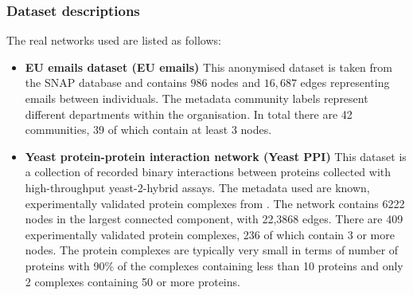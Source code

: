 \documentclass[sigconf]{acmart}
\begin{document}
\subsubsection{Dataset descriptions}
\label{sec:real_network_descs}
The real networks used are listed as follows:
\begin{itemize}
 \item \textbf{EU emails dataset (EU emails)} This anonymised dataset is taken from the SNAP database \cite{snap} and contains $986$ nodes and $16,687$ edges representing emails between individuals.
 The metadata community labels represent different departments within the organisation.
 In total there are 42 communities, 39 of which contain at least 3 nodes.
 
 \item \textbf{Yeast protein-protein interaction network (Yeast PPI)} \cite{yeast_ppi}
 This dataset is a collection of recorded binary interactions between proteins collected with high-throughput yeast-2-hybrid assays.
 The metadata used are known, experimentally validated protein complexes from \cite{yeast_ppi_complexes}.
 The network contains 6222 nodes in the largest connected component, with 22,3868 edges.
 There are 409 experimentally validated protein complexes, 236 of which contain 3 or more nodes.
 The protein complexes are typically very small in terms of number of proteins with  90\% of the complexes containing less than 10 proteins and only 2 complexes containing 50 or more proteins.
 
\end{itemize}
\end{document}
